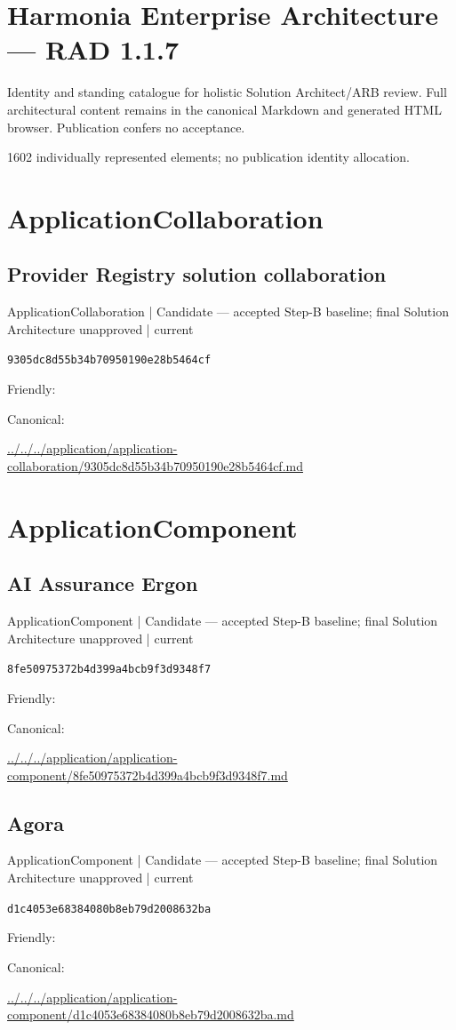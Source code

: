 \documentclass[10pt,a4paper]{article}
\begin{document}
\section*{Harmonia Enterprise Architecture — RAD 1.1.7}
Identity and standing catalogue for holistic Solution Architect/ARB review. Full architectural content remains in the canonical Markdown and generated HTML browser. Publication confers no acceptance.\par
1602 individually represented elements; no publication identity allocation.\par
\section*{ApplicationCollaboration}
\subsection*{Provider Registry solution collaboration}
{\small ApplicationCollaboration | Candidate — accepted Step-B baseline; final Solution Architecture unapproved | current}\par
\texttt{9305dc8d55b34b70950190e28b5464cf}\par
Friendly: \par
Canonical: \par
{\footnotesize\url{../../../application/application-collaboration/9305dc8d55b34b70950190e28b5464cf.md}}\par
\section*{ApplicationComponent}
\subsection*{AI Assurance Ergon}
{\small ApplicationComponent | Candidate — accepted Step-B baseline; final Solution Architecture unapproved | current}\par
\texttt{8fe50975372b4d399a4bcb9f3d9348f7}\par
Friendly: \par
Canonical: \par
{\footnotesize\url{../../../application/application-component/8fe50975372b4d399a4bcb9f3d9348f7.md}}\par
\subsection*{Agora}
{\small ApplicationComponent | Candidate — accepted Step-B baseline; final Solution Architecture unapproved | current}\par
\texttt{d1c4053e68384080b8eb79d2008632ba}\par
Friendly: \par
Canonical: \par
{\footnotesize\url{../../../application/application-component/d1c4053e68384080b8eb79d2008632ba.md}}\par
\end{document}
